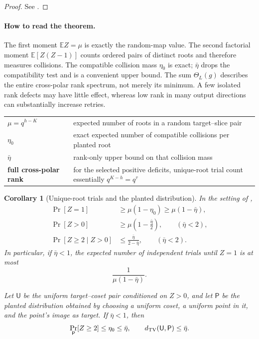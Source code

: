 \documentclass[11pt]{article}
\newtheorem{corollary}[corollary]{Corollary}
\begin{document}
\begin{proof}
See .
\end{proof}

\paragraph{How to read the theorem.}
The first moment $\mathbb EZ=\mu$ is exactly the random-map value.  The second
factorial moment $\mathbb E[Z(Z-1)]$ counts ordered pairs of distinct roots and
therefore measures collisions.  The compatible collision mass $\eta_0$ is
exact; $\bar\eta$ drops the compatibility test and is a convenient upper
bound.  The sum $\Theta_L(g)$ describes the entire cross-polar rank spectrum,
not merely its minimum.  A few isolated rank defects may have little effect,
whereas low rank in many output directions can substantially increase retries.

\begin{center}
\begin{tabularx}{0.92\textwidth}{@{}>{\bfseries}p{}X@{}}
$\mu=q^{h-K}$ & expected number of roots in a random target--slice pair\\
$\eta_0$ & exact expected number of compatible collisions per planted root\\
$\bar\eta$ & rank-only upper bound on that collision mass\\
full cross-polar rank & for the selected positive deficits, unique-root trial
count essentially $q^{K-h}=q^\tau$
\end{tabularx}
\end{center}

\begin{corollary}[Unique-root trials and the planted distribution]
\label{cor:singleton-coset}
In the setting of ,
\begin{align}
 \Pr[Z=1]&\ge\mu(1-\eta_0)
             \ge\mu(1-\bar\eta),\label{eq:singleton-coset}\\
 \Pr[Z>0]&\ge\mu\left(1-\frac{\bar\eta}{2}\right),
 \qquad (\bar\eta<2),\label{eq:bonferroni-success}\\
 \Pr[Z\ge2\mid Z>0]&\le\frac{\bar\eta}{2-\bar\eta},
 \qquad (\bar\eta<2).\label{eq:conditional-multiple}
\end{align}
In particular, if $\bar\eta<1$, the expected number of independent trials
until $Z=1$ is at most
\begin{equation}\label{eq:unique-retry-general}
 \frac{1}{\mu(1-\bar\eta)}.
\end{equation}

Let $\mathsf U$ be the uniform target--coset pair conditioned on $Z>0$, and
let $\mathsf P$ be the planted distribution obtained by choosing a uniform
coset, a uniform point in it, and the point's image as target.  If
$\bar\eta<1$, then
\begin{equation}\label{eq:planted-tv}
 \Pr_{\mathsf P}[Z\ge2]\le\eta_0\le\bar\eta,
 \qquad
 d_{\rm TV}(\mathsf U,\mathsf P)\le\bar\eta.
\end{equation}
\end{corollary}
\end{document}
